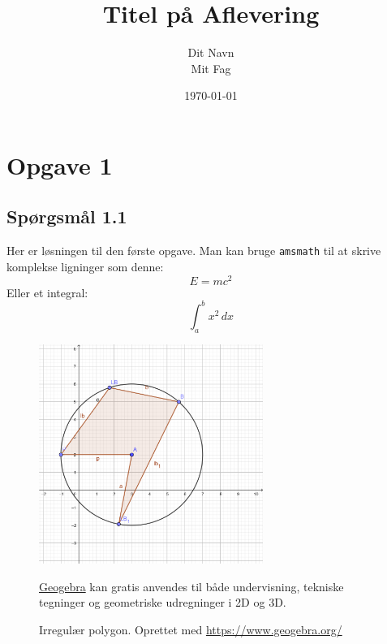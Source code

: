 \documentclass[a4paper, 12pt]{article}
\title{Titel på Aflevering}
\author{Dit Navn \\ Mit Fag}
\date{\today}
\begin{document}
\maketitle
\thispagestyle{empty} %
\newpage
\setcounter{page}{1}




\section{Opgave 1}
\subsection*{Spørgsmål 1.1}
Her er løsningen til den første opgave. Man kan bruge \texttt{amsmath} til at skrive komplekse ligninger som denne:
$$
E = mc^2
$$
Eller et integral:
$$
\int_{a}^{b} x^2 \,dx
$$
\begin{figure}[h!]
    \centering
    \includegraphics[width = 0.65\textwidth]{geogebra-polyg.png}
    \caption[List of Figures tekst (\texttt{\ listoffigures})]{Irregulær polygon. Oprettet med \url{https://www.geogebra.org/}} \href{https://www.geogebra.org/}{Geogebra} kan gratis anvendes til både undervisning, tekniske tegninger og geometriske udregninger i 2D og 3D.
    \label{fig:geog-poly1}
\end{figure}
\end{document}
